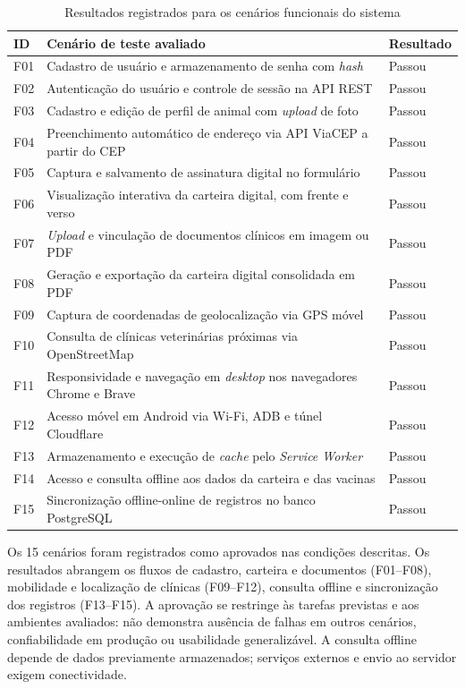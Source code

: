 \documentclass{UNESC}
\newcommand{\fonte}[1]{\par\noindent{\footnotesize\normalfont\raggedright Fonte: #1\par}}
\begin{document}
\begin{table}[htbp]
\centering
\caption{Resultados registrados para os cenários funcionais do sistema}
\label{tab:testes_funcionais}
\footnotesize
\setlength{\tabcolsep}{4pt}
\renewcommand{\arraystretch}{1.1}
\begin{tabularx}{\linewidth}{@{}L{.08\linewidth}Y L{.16\linewidth}@{}}
\hline
\textbf{ID} & \textbf{Cenário de teste avaliado} & \textbf{Resultado} \\
\hline
F01 & Cadastro de usuário e armazenamento de senha com \textit{hash} & Passou \\
F02 & Autenticação do usuário e controle de sessão na API REST & Passou \\
F03 & Cadastro e edição de perfil de animal com \textit{upload} de foto & Passou \\
F04 & Preenchimento automático de endereço via API ViaCEP a partir do CEP & Passou \\
F05 & Captura e salvamento de assinatura digital no formulário & Passou \\
F06 & Visualização interativa da carteira digital, com frente e verso & Passou \\
F07 & \textit{Upload} e vinculação de documentos clínicos em imagem ou PDF & Passou \\
F08 & Geração e exportação da carteira digital consolidada em PDF & Passou \\
F09 & Captura de coordenadas de geolocalização via GPS móvel & Passou \\
F10 & Consulta de clínicas veterinárias próximas via OpenStreetMap & Passou \\
F11 & Responsividade e navegação em \textit{desktop} nos navegadores Chrome e Brave & Passou \\
F12 & Acesso móvel em Android via Wi-Fi, ADB e túnel Cloudflare & Passou \\
F13 & Armazenamento e execução de \textit{cache} pelo \textit{Service Worker} & Passou \\
F14 & Acesso e consulta offline aos dados da carteira e das vacinas & Passou \\
F15 & Sincronização offline-online de registros no banco PostgreSQL & Passou \\
\hline
\end{tabularx}
\fonte{Elaborado pelo autor.}
\end{table}

Os 15 cenários foram registrados como aprovados nas condições descritas. Os resultados abrangem os fluxos de cadastro, carteira e documentos (F01--F08), mobilidade e localização de clínicas (F09--F12), consulta offline e sincronização dos registros (F13--F15). A aprovação se restringe às tarefas previstas e aos ambientes avaliados: não demonstra ausência de falhas em outros cenários, confiabilidade em produção ou usabilidade generalizável. A consulta offline depende de dados previamente armazenados; serviços externos e envio ao servidor exigem conectividade.
\end{document}
